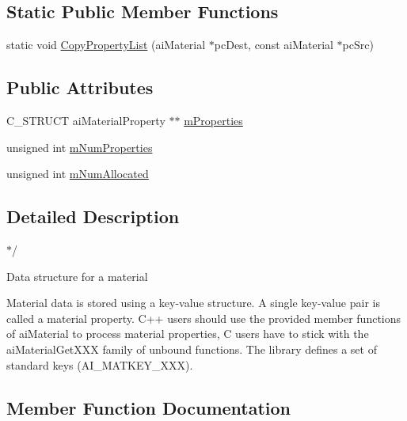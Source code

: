 \subsection*{Static Public Member Functions}
\begin{DoxyCompactItemize}
\item 
static void \hyperlink{structendif_af2407ec9a1f919efc36017bb1c414841}{Copy\+Property\+List} (ai\+Material $\ast$pc\+Dest, const ai\+Material $\ast$pc\+Src)
\end{DoxyCompactItemize}
\subsection*{Public Attributes}
\begin{DoxyCompactItemize}
\item 
C\+\_\+\+S\+T\+R\+U\+CT ai\+Material\+Property $\ast$$\ast$ \hyperlink{structendif_a95295db8cbd37f02553457d84d65068a}{m\+Properties}
\item 
unsigned int \hyperlink{structendif_a751ff065f0b034cfd9cd08d7bc41d668}{m\+Num\+Properties}
\item 
unsigned int \hyperlink{structendif_add50ca52ed05564f2187b9893fb1f584}{m\+Num\+Allocated}
\end{DoxyCompactItemize}


\subsection{Detailed Description}
$\ast$/ 

Data structure for a material

Material data is stored using a key-\/value structure. A single key-\/value pair is called a \textquotesingle{}material property\textquotesingle{}. C++ users should use the provided member functions of ai\+Material to process material properties, C users have to stick with the ai\+Material\+Get\+X\+XX family of unbound functions. The library defines a set of standard keys (A\+I\+\_\+\+M\+A\+T\+K\+E\+Y\+\_\+\+X\+XX). 

\subsection{Member Function Documentation}
